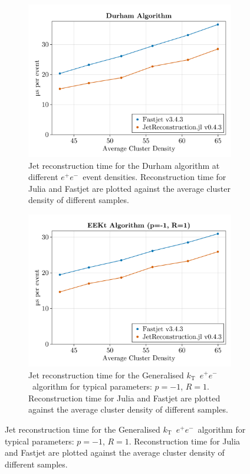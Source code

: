 \documentclass{webofc}
\newcommand{\kt}{${k}_\text{T}$}
\newcommand{\ee}{$e^+e^-$}
\begin{document}
\begin{figure}[h]
    \begin{subfigure}{0.47\textwidth}
        \begin{center}
            \includegraphics[width=0.8\linewidth]{Alma9-AMD-Ryzen7-Julia-FastJet-Durham.png}
            \caption{Jet reconstruction time for the Durham algorithm at different \ee\ event densities. Reconstruction time for Julia and Fastjet are plotted against the average cluster density of different samples.}
            \label{fig:eeDurham}
        \end{center}
    \end{subfigure}
    \hfill
    \begin{subfigure}{0.47\textwidth}
        \begin{center}
            \includegraphics[width=0.8\linewidth]{Alma9-AMD-Ryzen7-Julia-FastJet-EEKt-R1.png}
            \caption{Jet reconstruction time for the Generalised \kt\ \ee\ algorithm for typical parameters: $p=-1$, $R=1$. Reconstruction time for Julia and Fastjet are plotted against the average cluster density of different samples.}
            \label{fig:eeKt}
        \end{center}
    \end{subfigure}
\end{figure}
\end{document}
